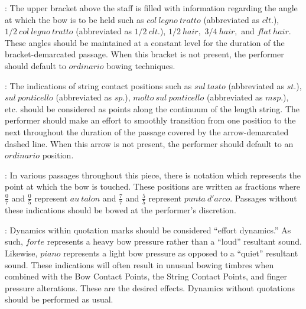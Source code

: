 \documentclass[10pt]{article}
\begin{document}
\begingroup
\begin{center}
 : The upper bracket above the staff is filled with information regarding the angle at which the bow is to be held such as $col \ legno \ tratto$ (abbreviated as $clt.$), $1/2 \ col \ legno \ tratto$ (abbreviated as $1/2 \ clt.$), $1/2 \ hair,$ $3/4 \ hair,$ and $flat \ hair.$ These angles should be maintained at a constant level for the duration of the bracket-demarcated passage. When this bracket is not present, the performer should default to $ordinario$ bowing techniques.
\rightskip\leftskip
\phantom{text} \hfill \phantom{()}

 : The indications of string contact positions such as $sul \ tasto$ (abbreviated as $st.$), $sul \ ponticello$ (abbreviated as $sp.$), $molto \ sul \ ponticello$ (abbreviated as $msp.$), etc. should be considered as points along the continuum of the length string. The performer should make an effort to smoothly transition from one position to the next throughout the duration of the passage covered by the arrow-demarcated dashed line. When this arrow is not present, the performer should default to an $ordinario$ position.
\rightskip\leftskip
\phantom{text} \hfill \phantom{()}

 : In various passages throughout this piece, there is notation which represents the point at which the bow is touched. These positions are written as fractions where \( \frac{0}{7} \) and  \( \frac{0}{5} \) represent $au \ talon$ and \( \frac{7}{7} \) and \( \frac{5}{5} \) represent $punta \ d'arco$. Passages without these indications should be bowed at the performer's discretion.
\rightskip\leftskip
\phantom{text} \hfill \phantom{()}

 : Dynamics within quotation marks should be considered ``effort dynamics.'' As such, $forte$ represents a heavy bow pressure rather than a ``loud'' resultant sound. Likewise, $piano$ represents a light bow pressure as opposed to a ``quiet'' resultant sound. These indications will often result in unusual bowing timbres when combined with the Bow Contact Points, the String Contact Points, and finger pressure alterations. These are the desired effects. Dynamics without quotations should be performed as usual.
\rightskip\leftskip
\phantom{text} \hfill \phantom{()}


\end{center}
\end{document}
